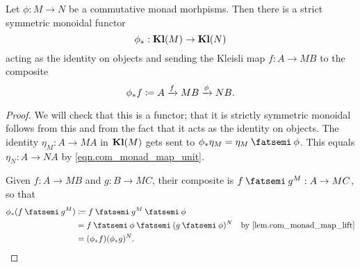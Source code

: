 \documentclass[DynamicalBook]{subfiles}
\begin{document}
\begin{proposition}
  Let $\phi : M \to N$ be a commutative monad morhpisms. Then there is a
  strict symmetric monoidal functor
  $$\phi_{\ast} : \textbf{Kl}(M) \to \textbf{Kl}(N)$$
  acting as the identity on objects and sending the Kleisli map $f : A \to MB$
  to the composite \[\phi_{\ast}f \coloneqq A \xrightarrow{f} M B \xrightarrow{\phi} N B.\]
\end{proposition}
\begin{proof}
  We will check that this is a functor; that it is strictly symmetric monoidal
  follows from this and from the fact that it acts as the identity on objects. 
  The identity $\eta_M : A \to M A$ in $\textbf{Kl}(M)$ gets sent to
  $\phi_{\ast}\eta_M = \eta_M \then \phi$. This equals $\eta_N : A \to NA$ by \cref{eqn.com_monad_map_unit}.

  Given $f : A \to MB$ and $g : B \to MC$, their composite is $f \then g^M : A
  \to M C$, so that
  \begin{align*}
    \phi_{\ast}(f \then g^M) &\coloneqq f \then g^M \then \phi \\
                             &= f \then \phi \then (g \then \phi)^N &\mbox{by \cref{lem.com_monad_map_lift}}\\
    &= (\phi_{\ast} f)(\phi_{\ast} g)^N.
  \end{align*} 
\end{proof}
\end{document}
